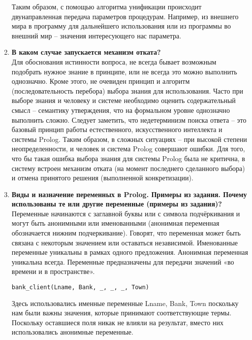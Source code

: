 \begin{enumerate}
    Таким образом, с помощью алгоритма унификации происходит двунаправленная передача параметров процедурам. Например, из внешнего мира в программу для дальнейшего использования или из программы во внешний мир – значения интересующего нас параметра. 
    
    
    
    \item \textbf{В каком случае запускается механизм отката?}\\
    Для обоснования истинности вопроса, не всегда бывает возможным подобрать нужное знание в принципе, или не всегда это можно выполнить однозначно. Кроме этого, не очевиден принцип и алгоритм (последовательность перебора) выбора знания для использования. Часто при выборе знания  и человеку и системе необходимо оценить содержательный смысл – семантику утверждения, что на формальном уровне однозначно выполнить сложно. Следует заметить, что недетерминизм поиска ответа – это базовый принцип работы естественного, искусственного интеллекта и системы Prolog. Таким образом, в сложных ситуациях – при высокой степени неопределенности, и человек и система Prolog совершают ошибки. Для того, что бы такая ошибка выбора знания для системы Prolog была не критична, в систему встроен механизм отката (на момент последнего сделанного выбора) и отмена принятого решения (выполненной конкретизации).
    
    \item \textbf{Виды и назначение переменных в Prolog. Примеры из задания.  Почему использованы те или другие переменные (примеры из задания)?}\\
    Переменные начинаются с заглавной буквы или с символа подчёркивания и могут быть анонимными или именованными (анонимная переменная обозначается нижним подчеркивание). Говорят, что переменная может быть связана с некоторым значением или оставаться независимой. Именованные переменные уникальны в рамках одного предложения. Анонимная переменная уникальна всегда. Переменные предназначены для передачи значений «во времени и в пространстве».
    \begin{lstlisting}[style=Prolog-pygsty]
    bank_client(Lname, Bank, _, _, _, Town) 
    \end{lstlisting}
    Здесь использовались именные переменные Lname, Bank, Town поскольку нам были важны значения, которые принимают соответствующие термы. Поскольку оставшиеся поля никак не влияли на результат, вместо них использовались анонимные переменные.
    

\end{enumerate}

